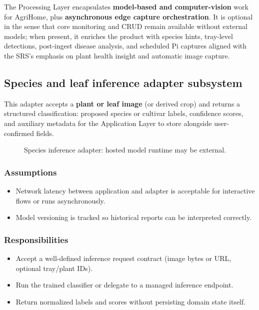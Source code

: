 The Processing Layer encapsulates \textbf{model-based and computer-vision} work for AgriHome, plus \textbf{asynchronous edge capture orchestration}. It is optional in the sense that core monitoring and CRUD remain available without external models; when present, it enriches the product with species hints, tray-level detections, post-ingest disease analysis, and scheduled Pi captures aligned with the SRS's emphasis on plant health insight and automatic image capture.

\subsection{Species and leaf inference adapter subsystem}

This adapter accepts a \textbf{plant or leaf image} (or derived crop) and returns a structured classification: proposed species or cultivar labels, confidence scores, and auxiliary metadata for the Application Layer to store alongside user-confirmed fields.

\begin{figure}[H]
\centering
{}
\caption{Species inference adapter: hosted model runtime may be external.}
\label{fig:proc-species}
\end{figure}

\subsubsection{Assumptions}
\begin{itemize}
  \item Network latency between application and adapter is acceptable for interactive flows or runs asynchronously.
  \item Model versioning is tracked so historical reports can be interpreted correctly.
\end{itemize}

\subsubsection{Responsibilities}
\begin{itemize}
  \item Accept a well-defined inference request contract (image bytes or URL, optional tray/plant IDs).
  \item Run the trained classifier or delegate to a managed inference endpoint.
  \item Return normalized labels and scores without persisting domain state itself.
\end{itemize}

